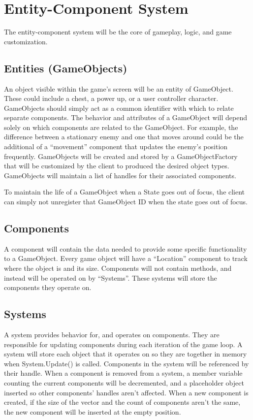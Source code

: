 \documentclass[12pt]{article}
\begin{document}
\section{Entity-Component System}
The entity-component system will be the core of gameplay, logic, and game customization.  

\subsection{Entities (GameObjects)}
An object visible within the game's screen will be an entity of GameObject.  These could include a chest, a power up, or a user controller character.  GameObjects should simply act as a common identifier with which to relate separate components.  The behavior and attributes of a GameObject will depend solely on which components are related to the GameObject.  For example, the difference between a stationary enemy and one that moves around could be the additional of a ``movement'' component that updates the enemy's position frequently.  GameObjects will be created and stored by a GameObjectFactory that will be customized by the client to produced the desired object types.  GameObjects will maintain a list of handles for their associated components.  

To maintain the life of a GameObject when a State goes out of focus, the client can simply not unregister that GameObject ID when the state goes out of focus.  

\subsection{	Components}
A component will contain the data needed to provide some specific functionality to a GameObject.  Every game object will have a ``Location'' component to track where the object is and its size.  Components will not contain methods, and instead will be operated on by ``Systems''.  These systems will store the components they operate on. 

\subsection{	Systems} 
A system provides behavior for, and operates on components.  They are responsible for updating components during each iteration of the game loop.  A system will store each object that it operates on so they are together in memory when System.Update() is called.  Components in the system will be referenced by their handle.  When a component is removed from a system, a member variable counting the current components will be decremented, and a placeholder object inserted so other components' handles aren't affected.  When a new component is created, if the size of the vector and the count of components aren't the same, the new component will be inserted at the empty position.  
\end{document}
